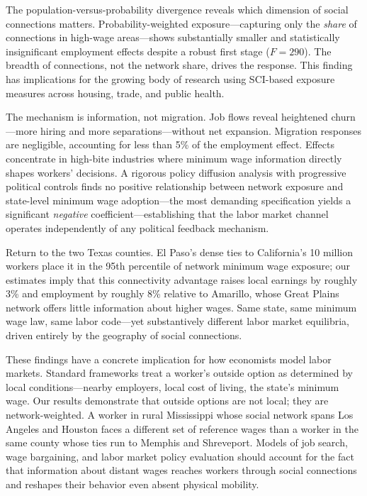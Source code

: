 \documentclass[12pt]{article}
\begin{document}
The population-versus-probability divergence reveals which dimension of social connections matters. Probability-weighted exposure---capturing only the \textit{share} of connections in high-wage areas---shows substantially smaller and statistically insignificant employment effects despite a robust first stage ($F = 290$). The breadth of connections, not the network share, drives the response. This finding has implications for the growing body of research using SCI-based exposure measures across housing, trade, and public health.

The mechanism is information, not migration. Job flows reveal heightened churn---more hiring and more separations---without net expansion. Migration responses are negligible, accounting for less than 5\% of the employment effect. Effects concentrate in high-bite industries where minimum wage information directly shapes workers' decisions. A rigorous policy diffusion analysis with progressive political controls finds no positive relationship between network exposure and state-level minimum wage adoption---the most demanding specification yields a significant \textit{negative} coefficient---establishing that the labor market channel operates independently of any political feedback mechanism.

Return to the two Texas counties. El Paso's dense ties to California's 10 million workers place it in the 95th percentile of network minimum wage exposure; our estimates imply that this connectivity advantage raises local earnings by roughly 3\% and employment by roughly 8\% relative to Amarillo, whose Great Plains network offers little information about higher wages. Same state, same minimum wage law, same labor code---yet substantively different labor market equilibria, driven entirely by the geography of social connections.

These findings have a concrete implication for how economists model labor markets. Standard frameworks treat a worker's outside option as determined by local conditions---nearby employers, local cost of living, the state's minimum wage. Our results demonstrate that outside options are not local; they are network-weighted. A worker in rural Mississippi whose social network spans Los Angeles and Houston faces a different set of reference wages than a worker in the same county whose ties run to Memphis and Shreveport. Models of job search, wage bargaining, and labor market policy evaluation should account for the fact that information about distant wages reaches workers through social connections and reshapes their behavior even absent physical mobility.
\end{document}
